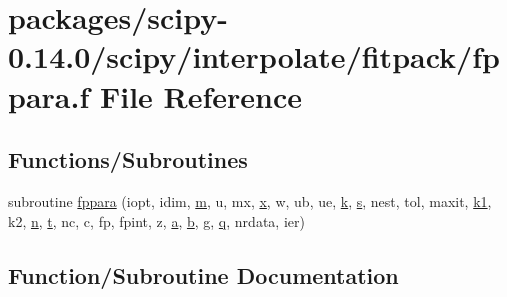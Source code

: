 \hypertarget{fppara_8f}{}\section{packages/scipy-\/0.14.0/scipy/interpolate/fitpack/fppara.f File Reference}
\label{fppara_8f}
\subsection*{Functions/\+Subroutines}
\begin{DoxyCompactItemize}
\item 
subroutine \hyperlink{fppara_8f_aa07a42c4d62ad850ec0bf081eaed0143}{fppara} (iopt, idim, \hyperlink{indexexpr_8h_ab72fdb4031d47b75ab26dd18a437bcdc}{m}, u, mx, \hyperlink{vecnorm1_8cc_ac73eed9e41ec09d58f112f06c2d6cb63}{x}, w, ub, ue, \hyperlink{indexexpr_8h_abb72938a198351550846b37a84588b63}{k}, \hyperlink{indexexpr_8h_ae024b0db549122b44c349ae28ec990dc}{s}, nest, tol, maxit, \hyperlink{cephes_8h_aea4a28d7f448efcb4713416bd1f3cf49}{k1}, k2, \hyperlink{indexexpr_8h_ab427e2e2b4d6cec55fa088ea2a692ace}{n}, \hyperlink{indexexpr_8h_a01709998b82be3f34e0412206618d09d}{t}, nc, c, fp, fpint, z, \hyperlink{gen__mat5files_8m_aae328bf20413f220e38aec4d95bfd6da}{a}, \hyperlink{gen__mat5files_8m_a7b38767b3b6a8dae167e5afa4fc340b0}{b}, g, \hyperlink{indexexpr_8h_ac886c3584e464b5533390d7440c9dd98}{q}, nrdata, ier)
\end{DoxyCompactItemize}


\subsection{Function/\+Subroutine Documentation}
\hypertarget{fppara_8f_aa07a42c4d62ad850ec0bf081eaed0143}{}
